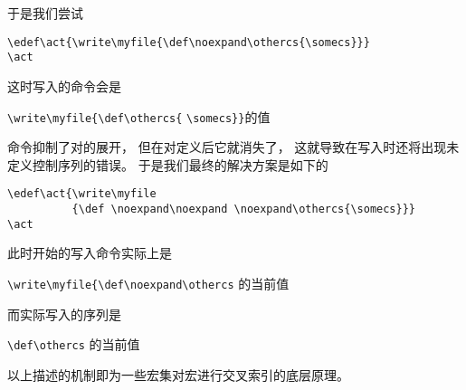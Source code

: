 \documentclass{book}
\begin{document}
于是我们尝试
\begin{verbatim}
\edef\act{\write\myfile{\def\noexpand\othercs{\somecs}}}
\act
\end{verbatim} 
这时写入的命令会是
\begin{disp}\verb>\write\myfile{\def\othercs{>\italic
     \verb>\somecs}}>的值\end{disp}
命令抑制了对的展开，
但在对定义后它就消失了，
这就导致在写入时还将出现未定义控制序列的错误。
于是我们最终的解决方案是如下的
\begin{verbatim}
\edef\act{\write\myfile
          {\def \noexpand\noexpand \noexpand\othercs{\somecs}}}
\act
\end{verbatim} 
此时开始的写入命令实际上是
\begin{disp}\verb>\write\myfile{\def\noexpand\othercs>\lb
     {\italic {}的当前值}\rb\end{disp}
而实际写入的序列是
\begin{disp}\verb>\def\othercs>\lb
     {\italic {}的当前值}\rb\end{disp}
以上描述的机制即为一些宏集对宏进行交叉索引的底层原理。
\end{document}

